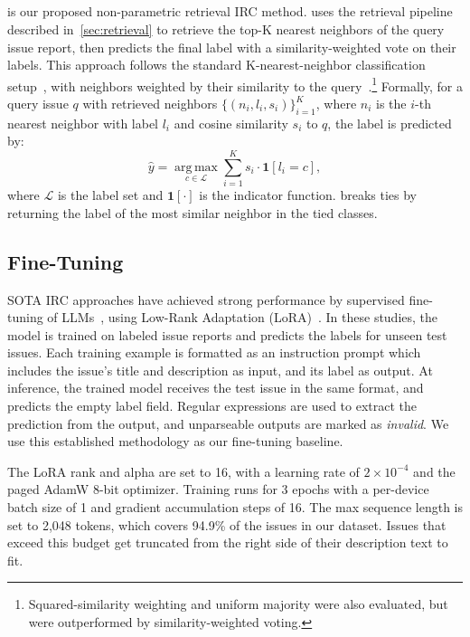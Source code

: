 \subsection{\votag}
\votag is our proposed non-parametric retrieval IRC method. \votag uses the retrieval pipeline described in~\cref{sec:retrieval} to retrieve the top-K nearest neighbors of the query issue report, then predicts the final
label with a similarity-weighted vote on their labels. This approach follows the standard K-nearest-neighbor classification setup~\cite{cover1967nearest}, with neighbors weighted by their similarity to the query~\cite{dudani1976distance}.\footnote{Squared-similarity weighting and uniform majority were also evaluated, but were outperformed by similarity-weighted voting.} Formally, for a
query issue $q$ with retrieved neighbors $\{(n_i, l_i, s_i)\}_{i=1}^{K}$, where
$n_i$ is the $i$-th nearest neighbor with label $l_i$ and cosine similarity $s_i$ to $q$, the label is predicted by:
\begin{equation}
    \hat{y} = \operatorname*{arg\,max}_{c \in \mathcal{L}}
    \sum_{i=1}^{K} s_i \cdot \mathbf{1}[l_i = c],
    \label{eq:votag}
\end{equation}
where $\mathcal{L}$ is the label set and $\mathbf{1}[\cdot]$ is the indicator function. \votag breaks ties by returning the label of the most similar neighbor in the tied classes.




\subsection{Fine-Tuning}
\label{sec:finetune}
SOTA IRC approaches have achieved strong performance by supervised
fine-tuning of LLMs~\cite{heo2025study,aracena2025applying,
aracena2024applyinglargelanguagemodels}, using Low-Rank Adaptation
(LoRA)~\cite{hu2022lora}. In these studies, the
model is trained on labeled issue reports and predicts the labels for
unseen test issues. Each training example is formatted as an
instruction prompt which includes the issue's title and description
as input, and its label as output. At inference, the trained model
receives the test issue in the same format, and predicts the empty
label field. Regular expressions are used to extract the prediction
from the output, and unparseable outputs are marked as
\textit{invalid}. We use this established methodology as our fine-tuning baseline.

The LoRA rank and alpha are set to 16, with a learning rate of $2 \times 10^{-4}$ and the paged AdamW 8-bit optimizer. Training runs for 3 epochs with a per-device batch size of 1 and gradient accumulation steps of 16. The max sequence length is set to 2,048 tokens, which covers 94.9\% of the issues in our dataset. Issues that exceed this budget get truncated from the right side of their description text to fit.



